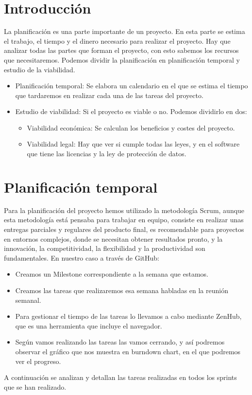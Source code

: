 
\section{Introducción}
La planificación es una parte importante de un proyecto. En esta parte se estima el trabajo, el tiempo y el dinero necesario para realizar el proyecto. Hay que analizar todas las partes que forman el proyecto, con esto sabemos los recursos que necesitaremos. Podemos dividir la planificación en planificación temporal y estudio de la viabilidad.
\begin{itemize}
\item Planificación temporal: Se elabora un calendario en el que se estima el tiempo que tardaremos en realizar cada una de las tareas del proyecto. 
\item Estudio de viabilidad: Si el proyecto es viable o no. Podemos dividirlo en dos:
\begin{itemize}
\item Viabilidad económica: Se calculan los beneficios y costes del proyecto.
\item Viabilidad legal: Hay que ver si cumple todas las leyes, y en el software que tiene las licencias y la ley de protección de datos.
\end{itemize}
\end{itemize}

\section{Planificación temporal}
Para la planificación del proyecto hemos utilizado la metodología Scrum, aunque esta metodología está pensaba para trabajar en equipo, consiste en realizar unas entregas parciales y regulares del producto final, es recomendable para proyectos en entornos complejos, donde se necesitan obtener resultados pronto, y la innovación, la competitividad, la flexibilidad y la productividad son fundamentales.
En nuestro caso a través de GitHub:
\begin{itemize}
\item Creamos un Milestone correspondiente a la semana que estamos.
\item Creamos las tareas que realizaremos esa semana habladas en la reunión semanal.
\item Para gestionar el tiempo de las tareas lo llevamos a cabo mediante ZenHub, que es una herramienta que incluye el  navegador.
\item Según vamos realizando las tareas las vamos cerrando, y así podremos observar el gráfico que nos muestra en burndown chart, en el que podremos ver el progreso.
\end{itemize}
A continuación se analizan y detallan las tareas realizadas en todos los sprints que se han realizado.
